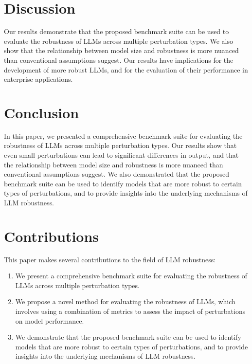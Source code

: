 \documentclass{article}
\begin{document}
\section{Discussion}
Our results demonstrate that the proposed benchmark suite can be used to evaluate the robustness of LLMs across multiple perturbation types. We also show that the relationship between model size and robustness is more nuanced than conventional assumptions suggest. Our results have implications for the development of more robust LLMs, and for the evaluation of their performance in enterprise applications.

\section{Conclusion}
In this paper, we presented a comprehensive benchmark suite for evaluating the robustness of LLMs across multiple perturbation types. Our results show that even small perturbations can lead to significant differences in output, and that the relationship between model size and robustness is more nuanced than conventional assumptions suggest. We also demonstrated that the proposed benchmark suite can be used to identify models that are more robust to certain types of perturbations, and to provide insights into the underlying mechanisms of LLM robustness.

\section{Contributions}
This paper makes several contributions to the field of LLM robustness:

\begin{enumerate}
\item We present a comprehensive benchmark suite for evaluating the robustness of LLMs across multiple perturbation types.
\item We propose a novel method for evaluating the robustness of LLMs, which involves using a combination of metrics to assess the impact of perturbations on model performance.
\item We demonstrate that the proposed benchmark suite can be used to identify models that are more robust to certain types of perturbations, and to provide insights into the underlying mechanisms of LLM robustness.
\end{enumerate}
\end{document}

